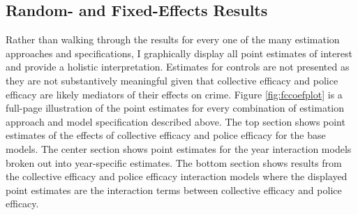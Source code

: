 \documentclass [11pt, proquest] {uwthesis}[2015/03/03]
\begin{document}
\hypertarget{random--and-fixed-effects-results}{%
\subsection{Random- and Fixed-Effects Results}\label{random--and-fixed-effects-results}}

Rather than walking through the results for every one of the many estimation approaches and specifications, I graphically display all point estimates of interest and provide a holistic interpretation. Estimates for controls are not presented as they are not substantively meaningful given that collective efficacy and police efficacy are likely mediators of their effects on crime. Figure \ref{fig:fccoefplot} is a full-page illustration of the point estimates for every combination of estimation approach and model specification described above. The top section shows point estimates of the effects of collective efficacy and police efficacy for the base models. The center section shows point estimates for the year interaction models broken out into year-specific estimates. The bottom section shows results from the collective efficacy and police efficacy interaction models where the displayed point estimates are the interaction terms between collective efficacy and police efficacy.
\end{document}
